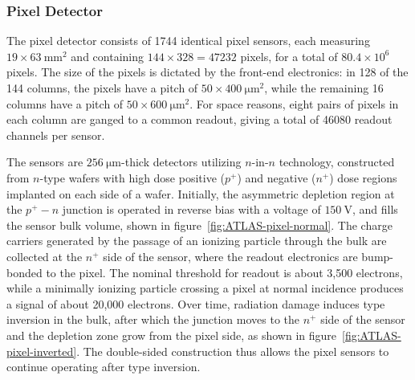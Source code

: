 \subsubsection{Pixel Detector}\label{sec:ATLAS-id-pixel-detector}

The pixel detector consists of 1744 identical pixel sensors, each measuring $19\times\SI{63}{\milli\meter\tothe{2}}$ and containing $144\times 328=47232$ pixels, for a total of $80.4\times 10^6$ pixels. The size of the pixels is dictated by the front-end electronics: in 128 of the 144 columns, the pixels have a pitch of $50\times \SI{400}{\micro\meter\tothe{2}}$, while the remaining 16 columns have a pitch of $50\times \SI{600}{\micro\meter\tothe{2}}$. For space reasons, eight pairs of pixels in each column are ganged to a common readout, giving a total of 46080 readout channels per sensor.

 The sensors are $\SI{256}{\micro\meter}$-thick detectors utilizing $n$-in-$n$ technology, constructed from $n$-type wafers with high dose positive ($p^+$) and negative ($n^+$) dose regions implanted on each side of a wafer. Initially, the asymmetric depletion region at the $p^+-n$ junction is operated in reverse bias with a voltage of $\SI{150}{\volt}$, and fills the sensor bulk volume, shown in figure~\ref{fig:ATLAS-pixel-normal}. The charge carriers generated by the passage of an ionizing particle through the bulk are collected at the $n^+$ side of the sensor, where the readout electronics are bump-bonded to the pixel. The nominal threshold for readout is about 3,500 electrons, while a minimally ionizing particle crossing a pixel at normal incidence produces a signal of about 20,000 electrons. Over time, radiation damage induces type inversion in the bulk, after which the junction moves to the $n^+$ side of the sensor and the depletion zone grow from the pixel side, as shown in figure~\ref{fig:ATLAS-pixel-inverted}. The double-sided construction thus allows the pixel sensors to continue operating after type inversion.

